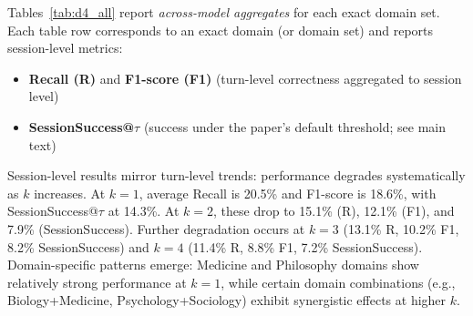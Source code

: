 Tables~\ref{tab:d4_all} report \emph{across-model aggregates} for each exact domain set. Each table row corresponds to an exact domain (or domain set) and reports session-level metrics:
\begin{itemize}
  \item \textbf{Recall (R)} and \textbf{F1-score (F1)} \hfill (turn-level correctness aggregated to session level)
  \item \textbf{SessionSuccess@$\tau$} \hfill (success under the paper's default threshold; see main text)
\end{itemize}

Session-level results mirror turn-level trends: performance degrades systematically as $k$ increases. At $k{=}1$, average Recall is 20.5\% and F1-score is 18.6\%, with SessionSuccess@$\tau$ at 14.3\%. At $k{=}2$, these drop to 15.1\% (R), 12.1\% (F1), and 7.9\% (SessionSuccess). Further degradation occurs at $k{=}3$ (13.1\% R, 10.2\% F1, 8.2\% SessionSuccess) and $k{=}4$ (11.4\% R, 8.8\% F1, 7.2\% SessionSuccess). Domain-specific patterns emerge: Medicine and Philosophy domains show relatively strong performance at $k{=}1$, while certain domain combinations (e.g., Biology+Medicine, Psychology+Sociology) exhibit synergistic effects at higher $k$.

